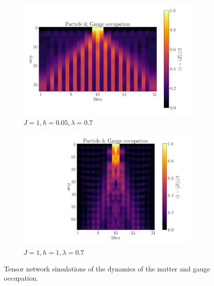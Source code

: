 \documentclass[a4paper]{article}
\begin{document}
\begin{figure}
    \centering
    \begin{subfigure}[c]{0.48\textwidth}
        \centering
        \includegraphics[width=\textwidth]{Results figs/tncirc_z2pairquench_maxt_8_steps_35_L_16_J_1.0000_h_0.0500_lamb_0.7000_g_None_pp_7_pl_1_xbasis_False_bd_256_prec_1e-05.png}
        \caption{$J = 1, h = 0.05, \lambda = 0.7$}
    \end{subfigure}
    \begin{subfigure}[c]{0.48\textwidth}
        \centering
        \includegraphics[width=\textwidth]{Results figs/tncirc_z2pairquench_maxt_16_steps_70_L_16_J_1.0000_h_1.0000_lamb_0.7000_g_None_pp_7_pl_1_xbasis_False_bd_256_prec_1e-05.png}
        \caption{$J = 1, h = 1, \lambda = 0.7$}
    \end{subfigure}
    \caption{Tensor network simulations of the dynamics of the matter and gauge occupation.}
    \label{eq:tn_simulations}
\end{figure}
\end{document}

